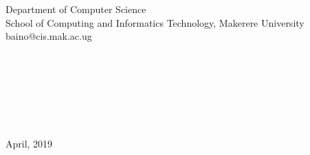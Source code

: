 \begin{titlepage}
\begin{center}
Department of Computer Science\\
School of Computing and Informatics Technology, Makerere University\\
baino@cis.mak.ac.ug\\~\\~\\~\\~\\~\\~\\~\\
April, 2019


\end{center}


\end{titlepage}